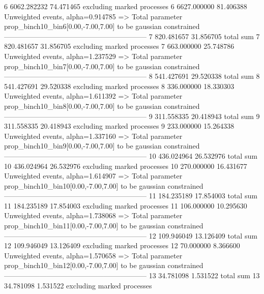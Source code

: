 6          6062.282232     74.471465       excluding marked processes    
6          6627.000000     81.406388       Unweighted events, alpha=0.914785
  => Total parameter prop_binch10_bin6[0.00,-7.00,7.00] to be gaussian constrained
------------------------------------------------------------
7          820.481657      31.856705       total sum                     
7          820.481657      31.856705       excluding marked processes    
7          663.000000      25.748786       Unweighted events, alpha=1.237529
  => Total parameter prop_binch10_bin7[0.00,-7.00,7.00] to be gaussian constrained
------------------------------------------------------------
8          541.427691      29.520338       total sum                     
8          541.427691      29.520338       excluding marked processes    
8          336.000000      18.330303       Unweighted events, alpha=1.611392
  => Total parameter prop_binch10_bin8[0.00,-7.00,7.00] to be gaussian constrained
------------------------------------------------------------
9          311.558335      20.418943       total sum                     
9          311.558335      20.418943       excluding marked processes    
9          233.000000      15.264338       Unweighted events, alpha=1.337160
  => Total parameter prop_binch10_bin9[0.00,-7.00,7.00] to be gaussian constrained
------------------------------------------------------------
10         436.024964      26.532976       total sum                     
10         436.024964      26.532976       excluding marked processes    
10         270.000000      16.431677       Unweighted events, alpha=1.614907
  => Total parameter prop_binch10_bin10[0.00,-7.00,7.00] to be gaussian constrained
------------------------------------------------------------
11         184.235189      17.854003       total sum                     
11         184.235189      17.854003       excluding marked processes    
11         106.000000      10.295630       Unweighted events, alpha=1.738068
  => Total parameter prop_binch10_bin11[0.00,-7.00,7.00] to be gaussian constrained
------------------------------------------------------------
12         109.946049      13.126409       total sum                     
12         109.946049      13.126409       excluding marked processes    
12         70.000000       8.366600        Unweighted events, alpha=1.570658
  => Total parameter prop_binch10_bin12[0.00,-7.00,7.00] to be gaussian constrained
------------------------------------------------------------
13         34.781098       1.531522        total sum                     
13         34.781098       1.531522        excluding marked processes    
